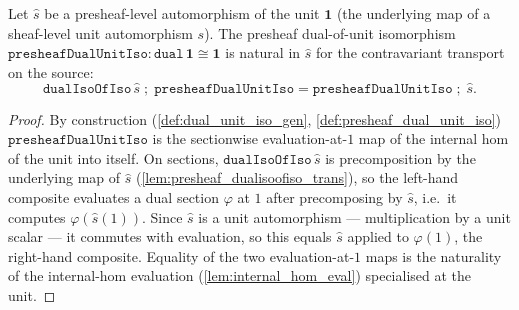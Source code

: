 \begin{lemma}


  \label{lem:presheafdualunitiso_naturality}
  Let \(\hat s\) be a presheaf-level automorphism of the unit \(\mathbf 1\) (the underlying map of a
  sheaf-level unit automorphism \(s\)). The presheaf dual-of-unit isomorphism
  \(\mathtt{presheafDualUnitIso} : \mathtt{dual}\,\mathbf 1 \cong \mathbf 1\) is natural in
  \(\hat s\) for the contravariant transport on the source:
  \[
    \mathtt{dualIsoOfIso}\,\hat s \;\mathbin{;}\; \mathtt{presheafDualUnitIso}
      = \mathtt{presheafDualUnitIso} \;\mathbin{;}\; \hat s.
  \]
\end{lemma}
\begin{proof}
  \leanok
  By construction (\cref{def:dual_unit_iso_gen}, \cref{def:presheaf_dual_unit_iso})
  \(\mathtt{presheafDualUnitIso}\) is the sectionwise evaluation-at-\(1\) map of the internal hom of
  the unit into itself. On sections, \(\mathtt{dualIsoOfIso}\,\hat s\) is precomposition by the
  underlying map of \(\hat s\) (\cref{lem:presheaf_dualisoofiso_trans}), so the left-hand composite
  evaluates a dual section \(\varphi\) at \(1\) after precomposing by \(\hat s\), i.e.\ it computes
  \(\varphi(\hat s(1))\). Since \(\hat s\) is a unit automorphism --- multiplication by a unit scalar
  --- it commutes with evaluation, so this equals \(\hat s\) applied to \(\varphi(1)\), the
  right-hand composite. Equality of the two evaluation-at-\(1\) maps is the naturality of the
  internal-hom evaluation (\cref{lem:internal_hom_eval}) specialised at the unit.
\end{proof}

